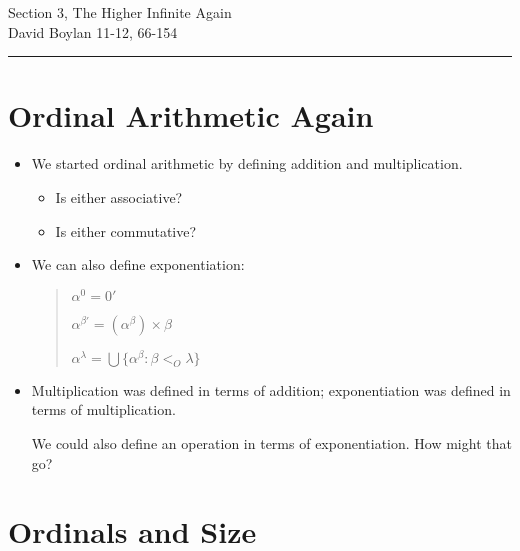 \documentclass[justified]{tufte-handout}
\newcommand{\HRule}{\rule{\linewidth}{0.1mm}}
\begin{document}
\frenchspacing

\begin{fullwidth}
\noindent\Large Section 3, The Higher Infinite Again \large \\[.3cm]
\noindent  David Boylan \hfill{11-12, 66-154}

\noindent\HRule
\end{fullwidth}


\section{Ordinal Arithmetic Again}

\begin{itemize}

\item We started ordinal arithmetic by defining addition and multiplication.


\begin{itemize}


\item Is either associative? 


\item Is either commutative?


\end{itemize}




\item  We can also define exponentiation:


\begin{quote}

$\alpha^0 =0'$

$\alpha^{\beta'} = (\alpha^\beta) \times \beta$

$\alpha^\lambda = \bigcup\{\alpha^\beta: \beta <_O \lambda\}$


\end{quote}


\item Multiplication was defined in terms of addition; exponentiation was defined in terms of multiplication. 

We could also define an operation in terms of exponentiation. How might that go? 

\end{itemize}

\section{Ordinals and Size}
\end{document}
